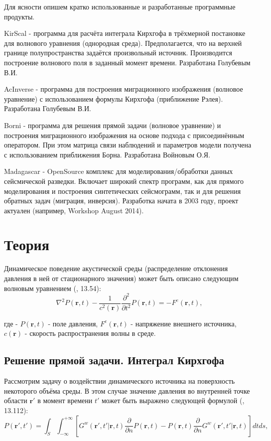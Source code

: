 \documentclass{article}
\renewcommand{\vec     } [1]     { \bm{#1}           }
\begin{document}
Для ясности опишем кратко использованные и разработанные программные продукты.

KirScal - программа для расчёта интеграла Кирхгофа в трёхмерной постановке для волнового уравнения (однородная среда). Предполагается, что на верхней границе полупространства задаётся произвольный источник. Производится построение волнового поля в заданный момент времени. Разработана Голубевым В.И.

AcInverse - программа для построения миграционного изображения (волновое уравнение) с использованием формулы Кирхгофа (приближение Рэлея).
Разработана Голубевым В.И.

Borni - программа для решения прямой задачи (волновое уравнение) и построения миграционного изображения на основе подхода с присоединённым оператором.
При этом матрица связи наблюдений и параметров модели получена с использованием приближения Борна.
Разработана Войновым О.Я.

Madagascar - OpenSource комплекс для моделирования/обработки данных сейсмической разведки.
Включает широкий спектр программ, как для прямого моделирования и построения синтетических сейсмограмм, так и для решения обратных задач (миграция, инверсия).
Разработка начата в 2003 году, проект актуален (например, Workshop August 2014).

\section{Теория}

Динамическое поведение акустической среды (распределение отклонения давления в ней от стационарного значения)
может быть описано следующим волновым уравнением (\cite{Zhdanov_2007}, 13.54):
\begin{equation}
\label{wave_equation}
\nabla^2P(\vec{r},t) - \frac{1}{c^2(\vec{r})}\frac{\partial^2}{\partial t^2}
	P(\vec{r},t) = - F^e(\vec{r},t),
\end{equation}

где - $P(\vec{r},t)$ - поле давления, $F^e(\vec{r},t)$ - напряжение внешнего источника, $c(\vec{r})$
- скорость распространения волны в среде.

\subsection{Решение прямой задачи. Интеграл Кирхгофа}

Рассмотрим задачу о воздействии динамического источника на поверхность некоторого объёма среды.
В этом случае значение давления во внутренней точке области $\vec{r'}$ в момент времени $t'$ может быть выражено следующей формулой (\cite{Zhdanov_2007}, 13.112):
\begin{equation}
\label{eq_kirchhoff_common}
P(\vec{r'}, t') = \int_S \int_{-\infty}^{+\infty} [G^w(\vec{r'}, t' | \vec{r}, t) \frac{\partial}
{\partial n} P(\vec{r}, t) - P(\vec{r}, t) \frac{\partial}{\partial n} G^w(\vec{r'}, t' |
\vec{r}, t)] dt ds,
\end{equation}
\end{document}
